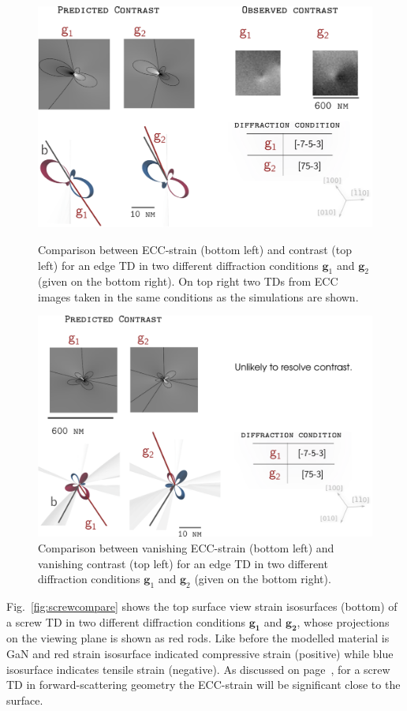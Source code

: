 \begin{figure}[htb]
    \centering
    \includegraphics[width=0.7\linewidth]{Figures/edgecompare.png}
    \caption[ECC-strain vs contrast for an edge TD]{ Comparison between ECC-strain (bottom left) and contrast (top left) for an edge TD in two different diffraction conditions $\textbf{g}_1$ and $\textbf{g}_2$ (given on the bottom right). On top right two TDs from ECC images taken in the same conditions as the simulations are shown.}
    \label{fig:edgecompare}

 \vspace*{\floatsep}

    \includegraphics[width=0.7\linewidth]{Figures/edgecompare0.png}
    \caption[Vanishing ECC-strain vs vanishing contrast for an edge TD]{ Comparison between vanishing ECC-strain (bottom left) and vanishing contrast (top left) for an edge TD in two different diffraction conditions $\textbf{g}_1$ and $\textbf{g}_2$ (given on the bottom right).}
    \label{fig:edgecompare0}
\end{figure}


Fig.~\ref{fig:screwcompare} shows the top surface view strain isosurfaces (bottom) of a screw TD in two different diffraction conditions $\mathbf{g_1}$ and $\mathbf{g_2}$, whose projections on the viewing plane is shown as red rods. Like before the modelled material is \hkl[001] GaN and red strain isosurface indicated compressive strain (positive) while blue isosurface indicates tensile strain (negative). As discussed on page~\pageref{fig:edge}, for a screw TD in forward-scattering geometry the ECC-strain will be significant close to the surface. 

